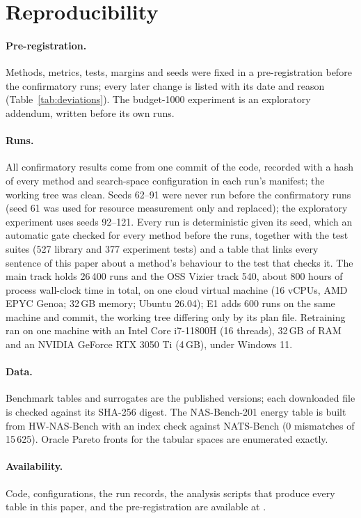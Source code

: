 
\section{Reproducibility}
\label{sec:reproducibility}

\paragraph{Pre-registration.} Methods, metrics, tests, margins and seeds were fixed in a pre-registration before the
confirmatory runs; every later change is listed with its date and reason (Table~\ref{tab:deviations}). The
budget-1000 experiment is an exploratory addendum, written before its own runs.

\paragraph{Runs.} All confirmatory results come from one commit of the code, recorded with a hash of every method and
search-space configuration in each run's manifest; the working tree was clean. Seeds 62--91 were never run before
the confirmatory runs (seed 61 was used for resource measurement only and replaced); the exploratory experiment
uses seeds 92--121. Every run is deterministic given its seed, which an automatic gate checked for every method
before the runs, together with the test suites (527 library and 377 experiment tests) and a table that links every
sentence of this paper about a method's behaviour to the test that checks it. The main track holds 26\,400 runs and the OSS Vizier track 540, about 800 hours
of process wall-clock time in total, on one cloud virtual machine (16 vCPUs, AMD EPYC Genoa; 32\,GB memory; Ubuntu
26.04); E1 adds 600 runs on the same machine and commit, the working tree differing only by
its plan file. Retraining ran on one machine with an Intel Core i7-11800H (16 threads), 32\,GB of RAM and an NVIDIA GeForce
RTX 3050 Ti (4\,GB), under Windows 11.

\paragraph{Data.} Benchmark tables and surrogates are the published versions; each downloaded file is checked
against its SHA-256 digest. The NAS-Bench-201 energy table is built from HW-NAS-Bench with an index check against
NATS-Bench (0 mismatches of 15\,625). Oracle Pareto fronts for the tabular spaces are enumerated exactly.

\paragraph{Availability.} Code, configurations, the run records, the analysis scripts that produce every table in
this paper, and the pre-registration are available at \anonrepo.
